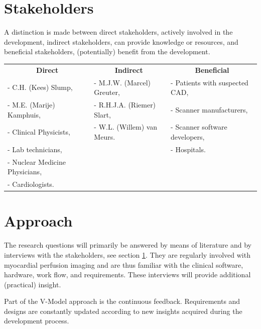 \section{Stakeholders}
\label{sec:stakeholders}
A distinction is made between direct stakeholders, actively involved in the development, indirect stakeholders, can provide knowledge or resources, and beneficial stakeholders, (potentially) benefit from the development.

\begin{tabular}{lll}
 	\multicolumn{1}{c}{\textbf{Direct}} & \multicolumn{1}{c}{\textbf{Indirect}} & \multicolumn{1}{c}{\textbf{Beneficial}} \\
	 - C.H. (Kees) Slump, &  - M.J.W. (Marcel) Greuter, & - Patients with suspected \ac{CAD}, \\
	 - M.E. (Marije) Kamphuis, & - R.H.J.A. (Riemer) Slart, & - Scanner manufacturers,\\
	 - Clinical Physicists, & - W.L. (Willem) van Meurs. & - Scanner software developers, \\
	 - Lab technicians, & & - Hospitals. \\
	 - Nuclear Medicine Physicians, & & \\
	 - Cardiologists. & & \\
\end{tabular}

\section{Approach}
The research questions will primarily be answered by means of literature and by interviews with the stakeholders, see section \ref{sec:stakeholders}. They are regularly involved with myocardial perfusion imaging and are thus familiar with the clinical software, hardware, work flow, and requirements. These interviews will provide additional (practical) insight.

Part of the V-Model approach is the continuous feedback. Requirements and designs are constantly updated according to new insights acquired during the development process. 

